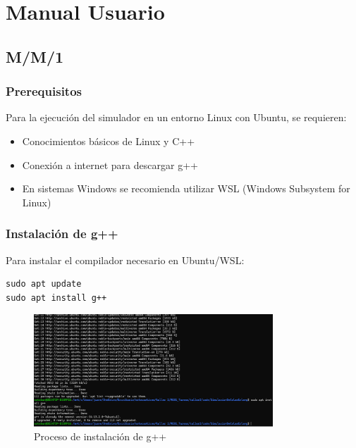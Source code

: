 \documentclass{article}
\begin{document}

\section{Manual Usuario}\label{sec:man_u}

\subsection{M/M/1}\label{subsec:mm1_usuario}

\subsubsection{Prerequisitos}
Para la ejecución del simulador en un entorno Linux con Ubuntu, se requieren:
\begin{itemize}
    \item Conocimientos básicos de Linux y C++
    \item Conexión a internet para descargar g++
    \item En sistemas Windows se recomienda utilizar WSL (Windows Subsystem for Linux)
\end{itemize}

\subsubsection{Instalación de g++}
Para instalar el compilador necesario en Ubuntu/WSL:
\begin{verbatim}
sudo apt update
sudo apt install g++
\end{verbatim}

\begin{figure}[H]
    \centering
    \includegraphics[width=0.8\textwidth]{images/manualUsuarioErlangBC_1.png}
    \caption{Proceso de instalación de g++}
    \label{fig:instalacion_mm1}
\end{figure}
\end{document}
